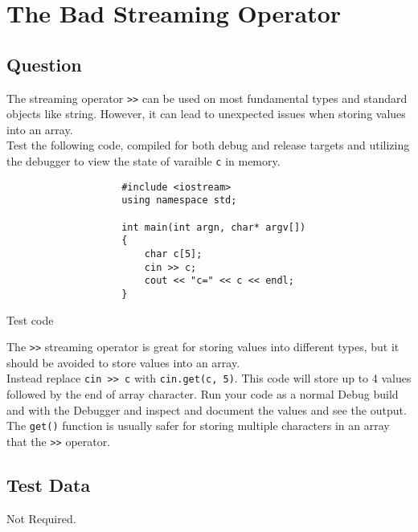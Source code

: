 \documentclass[Lab-B.tex]{subfiles}
\begin{document}
    \section{The Bad Streaming Operator}
        \subsection{Question}
            The streaming operator \texttt{>>} can be used on most fundamental types and standard objects like string. However, 
            it can lead to unexpected issues when storing values into an array.\\

            Test the following code, compiled for both debug and release targets and 
            utilizing the debugger to view the state of varaible \texttt{c} in memory. \\
    
            \begin{listing}[H]
                \begin{verbatim}
                    #include <iostream>
                    using namespace std;

                    int main(int argn, char* argv[])
                    {
                        char c[5];
                        cin >> c;
                        cout << "c=" << c << endl;
                    }
                \end{verbatim}
                \caption{Test code}
            \end{listing}

            The \texttt{>>} streaming operator is great for storing values into different types, 
            but it should be avoided to store values into an array.\\

            Instead replace \texttt{cin >> c} with \texttt{cin.get(c, 5)}.
            This code will store up to 4 values followed by the end of array character. 
            Run your code as a normal Debug build and with the Debugger and inspect and document the values and see the output. 
            The \texttt{get()} function is usually safer for storing multiple characters in an array that the \texttt{>>} operator.
            
        \subsection{Test Data}
            Not Required.
        
\end{document}
